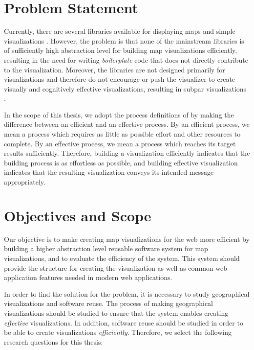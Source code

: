 \section{Problem Statement}

Currently, there are several libraries available for displaying maps and simple visualizations \citep{google_maps_2005,agafonkin_leaflet_2011,metacarta_openlayers_2006}. However, the problem is that none of the mainstream libraries is of sufficiently high abstraction level for building map visualizations efficiently, resulting in the need for writing \emph{boilerplate} code that does not directly contribute to the visualization. Moreover, the libraries are not designed primarily for visualizations and therefore do not encourage or push the visualizer to create visually and cognitively effective visualizations, resulting in subpar visualizations \citep[chap.~1]{slocum_thematic_2014}.

In the scope of this thesis, we adopt the process definitions of \citet{van_wijk_value_2005} by making the difference between an efficient and an effective process. By an efficient process, we mean a process which requires as little as possible effort and other resources to complete. By an effective process, we mean a process which reaches its target results sufficiently. Therefore, building a visualization efficiently indicates that the building process is as effortless as possible, and building effective visualization indicates that the resulting visualization conveys its intended message appropriately.

\section{Objectives and Scope}

Our objective is to make creating map visualizations for the web more efficient by building a higher abstraction level reusable software system for map visualizations, and to evaluate the efficiency of the system. This system should provide the structure for creating the visualization as well as common web application features needed in modern web applications.

In order to find the solution for the problem, it is necessary to study geographical visualizations and software reuse. The process of making geographical visualizations should be studied to ensure that the system enables creating \emph{effective} visualizations. In addition, software reuse should be studied in order to be able to create visualizations \emph{efficiently}. Therefore, we select the following research questions for this thesis:

